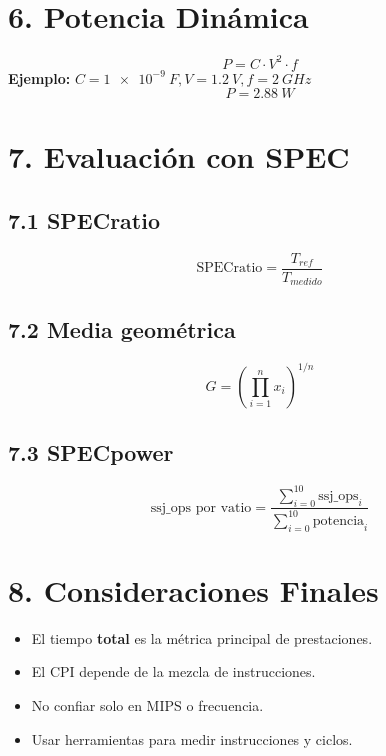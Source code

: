 \documentclass[12pt]{article}
\begin{document}
\section*{6. Potencia Din\'amica}
\[ P = C \cdot V^2 \cdot f \]
\textbf{Ejemplo:} $C = \SI{1e-9}{F}, V = \SI{1.2}{V}, f = \SI{2}{GHz}$
\[ P = 2.88~\si{W} \]

\section*{7. Evaluaci\'on con SPEC}
\subsection*{7.1 SPECratio}
\[ \text{SPECratio} = \frac{T_{ref}}{T_{medido}} \]
\subsection*{7.2 Media geom\'etrica}
\[ G = \left( \prod_{i=1}^{n} x_i \right)^{1/n} \]

\subsection*{7.3 SPECpower}
\[ \text{ssj\_ops por vatio} = \frac{\sum_{i=0}^{10} \text{ssj\_ops}_i}{\sum_{i=0}^{10} \text{potencia}_i} \]

\section*{8. Consideraciones Finales}
\begin{itemize}
  \item El tiempo \textbf{total} es la m\'etrica principal de prestaciones.
  \item El CPI depende de la mezcla de instrucciones.
  \item No confiar solo en MIPS o frecuencia.
  \item Usar herramientas para medir instrucciones y ciclos.
\end{itemize}
\end{document}
